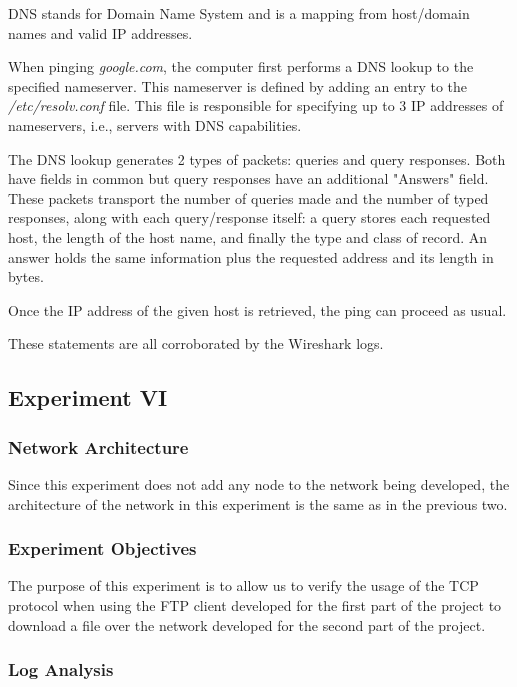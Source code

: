 DNS stands for Domain Name System and is a mapping from host/domain names and valid IP addresses.

When pinging \textit{google.com}, the computer first performs a DNS lookup to the specified nameserver. This nameserver is defined by adding an entry to the \textit{/etc/resolv.conf} file. This file is responsible for specifying up to 3 IP addresses of nameservers, i.e., servers with DNS capabilities.

The DNS lookup generates 2 types of packets: queries and query responses. Both have fields in common but query responses have an additional "Answers" field. These packets transport the number of queries made and the number of typed responses, along with each query/response itself: a query stores each requested host, the length of the host name, and finally the type and class of record. An answer holds the same information plus the requested address and its length in bytes.

Once the IP address of the given host is retrieved, the ping can proceed as usual.

These statements are all corroborated by the Wireshark logs.

\subsection{Experiment VI}

\subsubsection{Network Architecture}

Since this experiment does not add any node to the network being developed, the architecture of the network in this experiment is the same as in the previous two.

\subsubsection{Experiment Objectives}

The purpose of this experiment is to allow us to verify the usage of the TCP protocol when using the FTP client developed for the first part of the project to download a file over the network developed for the second part of the project.

\subsubsection{Log Analysis}

